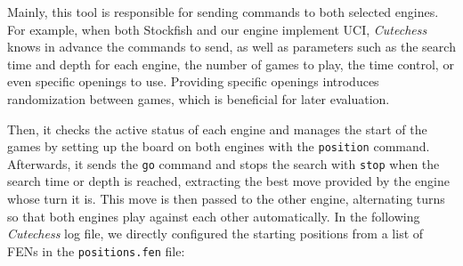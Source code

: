 \noindent Mainly, this tool is responsible for sending commands to both selected engines. For example, when both Stockfish and our engine implement UCI, \textit{Cutechess} knows in advance the commands to send, as well as parameters such as the search time and depth for each engine, the number of games to play, the time control, or even specific openings to use. Providing specific openings introduces randomization between games, which is beneficial for later evaluation.

\vspace{1em}

\noindent Then, it checks the active status of each engine and manages the start of the games by setting up the board on both engines with the \texttt{position} command. Afterwards, it sends the \texttt{go} command and stops the search with \texttt{stop} when the search time or depth is reached, extracting the best move provided by the engine whose turn it is. This move is then passed to the other engine, alternating turns so that both engines play against each other automatically. In the following \textit{Cutechess} log file, we directly configured the starting positions from a list of FENs in the \texttt{positions.fen} file:

